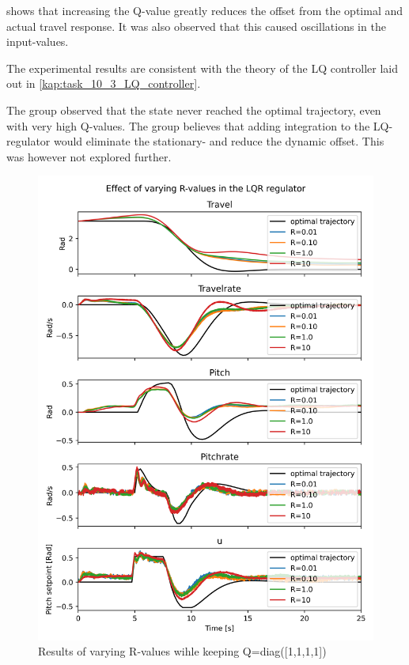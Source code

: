 \documentclass[../main.tex]{subfiles}
\begin{document}
 shows that increasing the Q-value greatly reduces the offset from the optimal and actual travel response. It was also observed that this caused oscillations in the input-values.

The experimental results are consistent with the theory of the LQ controller laid out in \cref{kap:task_10_3_LQ_controller}.

The group observed that the state never reached the optimal trajectory, even with very high Q-values. The group believes that adding integration to the LQ-regulator would eliminate the stationary- and reduce the dynamic offset. This was however not explored further.

\begin{figure}[h]
    \includegraphics[width=\linewidth]{figures/LAB3_R_variations.png}
	\caption{Results of varying R-values wihle keeping Q=diag([1,1,1,1])}
	\label{fig:LAB3_R_variations}
\end{figure}
\end{document}
